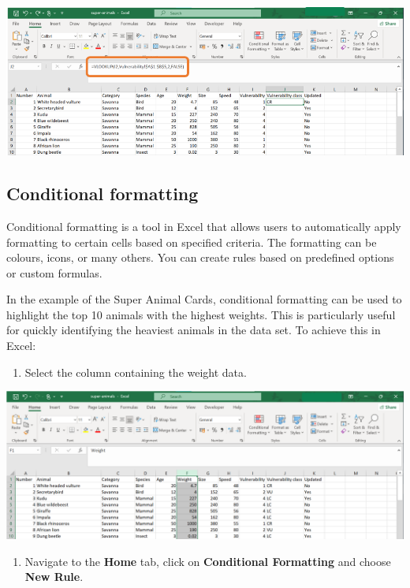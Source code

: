 \documentclass[
]{book}
\providecommand{\tightlist}{%
  \setlength{\itemsep}{0pt}\setlength{\parskip}{0pt}}
\begin{document}
\begin{center}\includegraphics[width=0.7\linewidth]{Figures/manipulation_1_formula} \end{center}

\subsection*{Conditional formatting}\label{conditional-formatting}

Conditional formatting is a tool in Excel that allows users to automatically apply formatting to certain cells based on specified criteria. The formatting can be colours, icons, or many others. You can create rules based on predefined options or custom formulas.

In the example of the Super Animal Cards, conditional formatting can be used to highlight the top 10 animals with the highest weights. This is particularly useful for quickly identifying the heaviest animals in the data set. To achieve this in Excel:

\begin{enumerate}
\def\labelenumi{\arabic{enumi}.}
\tightlist
\item
  Select the column containing the weight data.
\end{enumerate}

\begin{center}\includegraphics[width=0.7\linewidth]{Figures/manipulation_2_1} \end{center}

\begin{enumerate}
\def\labelenumi{\arabic{enumi}.}
\setcounter{enumi}{1}
\tightlist
\item
  Navigate to the \textbf{Home} tab, click on \textbf{Conditional Formatting} and choose \textbf{New Rule}.
\end{enumerate}
\end{document}
